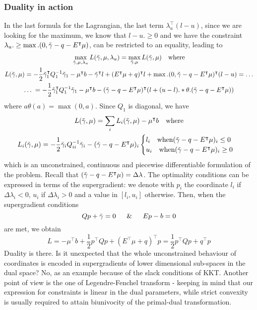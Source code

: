 \documentclass[twoside]{mfitjournal}
\begin{document}
\subsubsection*{Duality in action}
In the last formula for the Lagrangian, the last term $\lambda_u^\intercal(l-u)$, since we are looking for the maximum, we know that $l-u .\ge 0$ and we have the constraint $\lambda_u .\ge \max.(0, \Tilde{\gamma} - q - E^\intercal\mu)$, can be restricted to an equality, leading to
\begin{gather*}
    \max_{\Tilde{\gamma}, \mu, \lambda_u} L(\Tilde{\gamma}, \mu, \lambda_u) = \max_{\Tilde{\gamma}, \mu} L(\tilde{\gamma}, \mu)  \quad \textrm{where} \\
    L(\tilde{\gamma}, \mu) = -\frac{1}{2} \Tilde{\gamma}_1^\intercal Q_1^{-1}\Tilde{\gamma}_1 - \mu^\intercal b - \Tilde{\gamma}^\intercal l + (E^\intercal\mu + q)^\intercal l + \max.(0, \Tilde{\gamma} - q - E^\intercal\mu)^\intercal(l-u) = \dots \\
    \dots \; = -\frac{1}{2} \Tilde{\gamma}_1^\intercal Q_1^{-1}\Tilde{\gamma}_1 - \mu^\intercal b -  (\Tilde{\gamma} - q - E^\intercal\mu)^\intercal(l + (u-l) .* \theta.(\Tilde{\gamma} - q - E^\intercal\mu))
\end{gather*}
where $a\theta(a) = \max(0, a)$. Since $Q_1$ is diagonal, we have
\begin{gather*}
    L(\tilde{\gamma}, \mu) = \sum_i L_i (\tilde{\gamma}, \mu) - \mu^\intercal b \quad \textrm{where} \\
    L_i (\tilde{\gamma}, \mu) = -\frac{1}{2} \Tilde{\gamma}_i Q_{ii}^{-1}\Tilde{\gamma}_i - (\Tilde{\gamma} - q - E^\intercal\mu)_i \begin{cases}
             l_i \quad \textrm{when} (\Tilde{\gamma} - q - E^\intercal\mu)_i \le 0 \\
             u_i \quad \textrm{when} (\Tilde{\gamma} - q - E^\intercal\mu)_i \ge 0
        \end{cases}
\end{gather*}
which is an unconstrained, continuous and piecewise differentiable formulation of the problem. Recall that $(\Tilde{\gamma} - q - E^\intercal\mu) = \Delta \lambda$.
The optimality conditions can be expressed in terms of the supergradient: we denote with $p_i$ the coordinate $l_i$ if $\Delta\lambda_i < 0$, $u_i$ if $\Delta\lambda_i > 0$ and a value in $[l_i, u_i]$ otherwise. Then, when the supergradient conditions
\[
    Q p + \Tilde{\gamma} = 0 \quad \And \quad E p - b = 0
\]
are met, we obtain
\[
L = -\mu^\intercal b + \frac{1}{2}p^\intercal Q p + (E^\intercal\mu + q)^\intercal p = \frac{1}{2}p^\intercal Q p + q^\intercal p
\]
Duality is there.
Is it unexpected that the whole unconstrained behaviour of coordinates is encoded in supergradients of lower dimensional sub-spaces in the dual space? No, as an example because of the slack conditions of KKT. Another point of view is the one of Legendre-Fenchel transform - keeping in mind that our expression for constraints is linear in the dual parameters, while strict convexity is usually required to attain biunivocity of the primal-dual transformation.
\end{document}
